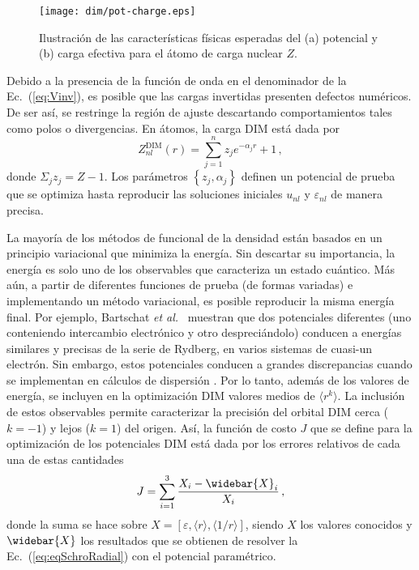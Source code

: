 \begin{figure}[t]
\centering
\texttt{[image: dim/pot-charge.eps]}
\caption[Características físicas del potencial y carga efectiva.]
{Ilustración de las características físicas esperadas del (a) potencial 
y (b) carga efectiva para el átomo de carga nuclear $Z$.}
\label{fig:potycharge}
\end{figure}

Debido a la presencia de la función de onda en el denominador de la 
Ec.~(\ref{eq:Vinv}), es posible que las cargas invertidas presenten 
defectos numéricos. De ser así, se restringe la región de ajuste 
descartando comportamientos tales como polos o divergencias. En átomos, 
la carga DIM está dada por
\begin{equation}
Z_{nl}^{\mathrm{DIM}}(r)= \sum_{j=1}^{n} z_j e^{-\alpha_j r}+1 \,,
\label{eq:atomzDIM}
\end{equation}
donde $\Sigma_j z_j=Z-1$. Los parámetros $\left\{z_j,\alpha_j\right\}$ 
definen un potencial de prueba que se optimiza hasta reproducir las 
soluciones iniciales $u_{nl}$ y $\varepsilon_{nl}$ de manera precisa. 

La mayoría de los métodos de funcional de la densidad están basados en 
un principio variacional que minimiza la energía. Sin 
descartar su importancia, la energía es solo uno de los observables que 
caracteriza un estado cuántico. Más aún, a partir de diferentes 
funciones de prueba (de formas variadas) e implementando un método 
variacional, es posible reproducir la misma energía final. Por ejemplo, 
Bartschat \textit{et al.}~\cite{Albright:93,Bartschat:96} muestran que 
dos potenciales diferentes (uno conteniendo intercambio electrónico y 
otro despreciándolo) conducen a energías similares y precisas de la 
serie de Rydberg, en varios sistemas de cuasi-un electrón. Sin embargo, 
estos potenciales conducen a grandes discrepancias cuando se implementan 
en cálculos de dispersión \cite{BartschatBray:96}. Por lo tanto, además 
de los valores de energía, se incluyen en la optimización DIM valores 
medios de $\langle r^k \rangle$. La inclusión de estos 
observables permite caracterizar la precisión del orbital DIM cerca 
($k=-1$) y lejos ($k=1$) del origen. Así, la función de costo $J$ que se 
define para la optimización de los potenciales DIM está dada por los 
errores relativos de cada una de estas cantidades
\begin{equation}
J=\sum_{i=1}^3 \frac{X_i-\widebar{X}_i}{X_i}\,,
\label{eq:fncosto-dim}
\end{equation}
donde la suma se hace sobre 
$X=\left[\varepsilon,\langle r \rangle,\langle 1/r \rangle\right]$, 
siendo $X$ los valores conocidos y $\widebar{X}$ los resultados que se 
obtienen de resolver la Ec.~(\ref{eq:eqSchroRadial}) con el potencial 
paramétrico. 

